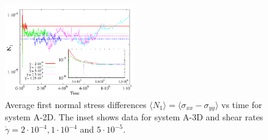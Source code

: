 \documentclass[8.5pt,twoside,twocolumn]{article}
\begin{document}
\begin{figure}[htp!]
\centering
\includegraphics[angle=0,width=0.5\textwidth]{N1_t_5e-4.pdf}
\caption{Average first normal stress differences $\langle N_1 \rangle= \langle \sigma_{xx}-\sigma_{yy}\rangle$ vs time for system A-2D. The inset shows data for system A-3D and shear rates $\dot{\gamma}=2\cdot10^{-4}, 1\cdot10^{-4}$ and $5\cdot10^{-5}$.}
\label{fig10}
\end{figure}
\end{document}
